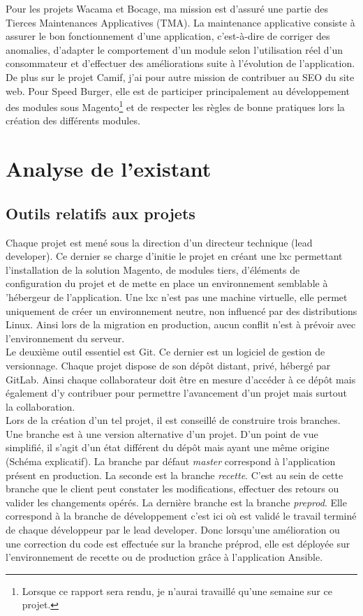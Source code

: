 \documentclass[12pt, a4paper, twoside]{report}
\begin{document}
Pour les projets Wacama et Bocage, ma mission est d'assuré une partie des Tierces Maintenances Applicatives (TMA). La maintenance applicative consiste à assurer le bon fonctionnement d'une application, c'est-à-dire de corriger des anomalies, d'adapter le comportement d'un module selon l'utilisation réel d'un consommateur et d'effectuer des améliorations suite à l'évolution de l'application. De plus sur le projet Camif, j'ai pour autre mission de contribuer au SEO du site web. Pour Speed Burger, elle est de participer principalement au développement des modules sous Magento\footnote{Lorsque ce rapport sera rendu, je n'aurai travaillé qu'une semaine sur ce projet.} et de respecter les règles de bonne pratiques lors la création des différents modules. 

\chapter{Analyse de l'existant}

\section{Outils relatifs aux projets}

Chaque projet est mené sous la direction d'un directeur technique (lead developer). Ce dernier se charge d'initie le projet en créant une lxc permettant l'installation de la solution Magento, de modules tiers,  d'éléments de configuration du projet et de mette en place un environnement semblable à 'hébergeur de l'application. Une lxc n'est pas une machine virtuelle, elle permet  uniquement de créer un environnement neutre, non influencé par des distributions Linux. Ainsi lors de la migration en production, aucun conflit n'est à prévoir avec l'environnement du serveur. \\

Le deuxième outil essentiel est Git. Ce dernier est un logiciel de gestion de versionnage. Chaque projet dispose de son dépôt distant, privé, hébergé par GitLab. Ainsi chaque collaborateur doit être en mesure d'accéder à ce dépôt mais également d'y contribuer pour permettre l'avancement d'un projet mais surtout la collaboration.  \\
Lors de la création d'un tel projet, il est conseillé de construire trois branches. Une branche est à une version alternative d'un projet. D'un point de vue simplifié, il s'agit d'un état différent du dépôt mais ayant une même origine (Schéma explicatif). La branche par défaut \textit{master} correspond à l'application présent en production. La seconde est la branche \textit{recette}. C'est au sein de cette branche que le client peut constater les modifications, effectuer des retours ou valider les changements opérés. La dernière branche est la branche \textit{preprod}. Elle correspond à la branche de développement c'est ici où est validé le travail terminé de chaque développeur par le lead developer. Donc lorsqu'une amélioration ou une correction du code est effectuée sur la branche préprod, elle est déployée sur l'environnement de recette ou de production grâce à l'application Ansible. \\
\end{document}
